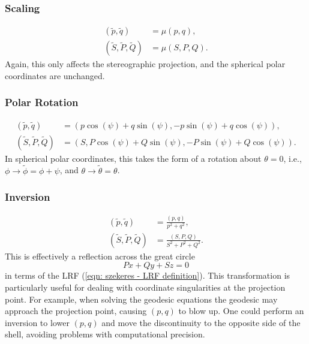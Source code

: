 \documentclass[a4paper,12pt]{report}
\begin{document}
\subsubsection{Scaling}
\begin{align}
  (\tilde{p},\tilde{q}) &= \mu(p, q),\\
  (\tilde{S},\tilde{P},\tilde{Q}) &= \mu(S, P, Q). \label{eqn: scaling dipole function transformation}
\end{align}
Again, this only affects the stereographic projection, and the spherical polar coordinates are unchanged.

\subsubsection{Polar Rotation}
\begin{align}
  (\tilde{p},\tilde{q}) &= (p\cos(\psi)+q\sin(\psi), -p\sin(\psi)+q\cos(\psi)),\\
  (\tilde{S},\tilde{P},\tilde{Q}) &= (S, P\cos(\psi)+Q\sin(\psi), -P\sin(\psi)+Q\cos(\psi)). \label{eqn: polar rotation dipole functions}
\end{align}
In spherical polar coordinates, this takes the form of a rotation about $\theta=0$, i.e., $\phi \to \tilde{\phi} = \phi+\psi$, and $\theta \to \tilde{\theta}=\theta$.

\subsubsection{Inversion}
\begin{align}
  (\tilde{p},\tilde{q}) &= \frac{(p, q)}{p^2 + q^2},\\
  (\tilde{S},\tilde{P},\tilde{Q}) &= \frac{(S, P, Q)}{S^2 + P^2 + Q^2}.
\end{align}
This is effectively a reflection across the great circle
\begin{equation}
  Px + Qy + Sz = 0
\end{equation}
in terms of the LRF (\ref{eqn: szekeres - LRF definition}). This transformation is particularly useful for dealing with coordinate singularities at the projection point. For example, when solving the geodesic equations the geodesic may approach the projection point, causing $(p,q)$ to blow up. One could perform an inversion to lower $(p,q)$ and move the discontinuity to the opposite side of the shell, avoiding problems with computational precision.
\end{document}
